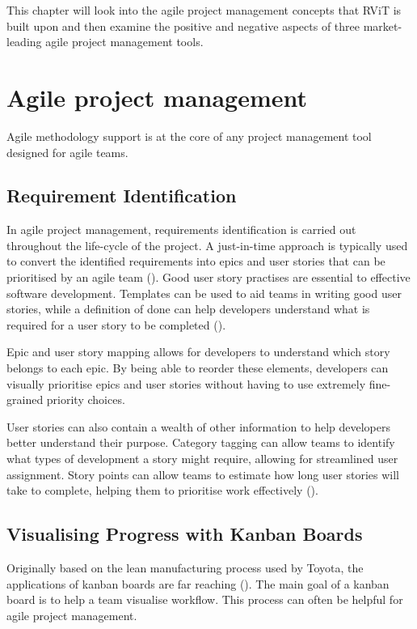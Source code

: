 \documentclass[l4proj.tex]{subfiles}
\begin{document}
    

This chapter will look into the agile project management concepts that RViT is built upon and then examine the positive and negative aspects of three market-leading agile project management tools.

\section{Agile project management}
Agile methodology support is at the core of any project management tool designed for agile teams.

\subsection{Requirement Identification}
In agile project management, requirements identification is carried out throughout the life-cycle of the project. A just-in-time approach is typically used to convert the identified requirements into epics and user stories that can be prioritised by an agile team (\cite{Schon2017}). Good user story practises are essential to effective software development. Templates can be used to aid teams in writing good user stories, while a definition of done can help developers understand what is required for a user story to be completed (\cite{Silva2017}).

Epic and user story mapping allows for developers to understand which story belongs to each epic. By being able to reorder these elements, developers can visually prioritise epics and user stories without having to use extremely fine-grained priority choices.

User stories can also contain a wealth of other information to help developers better understand their purpose. Category tagging can allow teams to identify what types of development a story might require, allowing for streamlined user assignment. Story points can allow teams to estimate how long user stories will take to complete, helping them to prioritise work effectively (\cite{Coelho2012}). 


\subsection{Visualising Progress with Kanban Boards}
Originally based on the lean manufacturing process used by Toyota, the applications of kanban boards are far reaching (\cite{Ahmad2018}). The main goal of a kanban board is to help a team visualise workflow. This process can often be helpful for agile project management.
\end{document}

